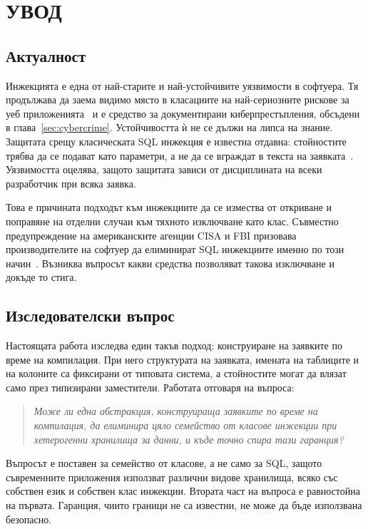 \section*{УВОД}
\label{sec:introduction}

\subsection*{Актуалност}

Инжекцията е една от най-старите и най-устойчивите уязвимости в софтуера. Тя
продължава да заема видимо място в класациите на най-сериозните рискове за
уеб приложенията~\cite{owasp_top10} и е средство за документирани
киберпрестъпления, обсъдени в глава~\ref{sec:cybercrime}. Устойчивостта ѝ не се
дължи на липса на знание. Защитата срещу класическата SQL инжекция е известна
отдавна: стойностите трябва да се подават като параметри, а не да се вграждат в
текста на заявката~\cite{owasp_sqli_prevention}. Уязвимостта оцелява, защото
защитата зависи от дисциплината на всеки разработчик при всяка заявка.

Това е причината подходът към инжекциите да се измества от откриване и поправяне
на отделни случаи към тяхното изключване като клас. Съвместно предупреждение на
американските агенции CISA и FBI призовава производителите на софтуер да
елиминират SQL инжекциите именно по този начин~\cite{cisa_sqli_alert}. Възниква
въпросът какви средства позволяват такова изключване и докъде то стига.

\subsection*{Изследователски въпрос}

Настоящата работа изследва един такъв подход: конструиране на заявките по време
на компилация. При него структурата на заявката, имената на таблиците и на
колоните са фиксирани от типовата система, а стойностите могат да влязат само
през типизирани заместители. Работата отговаря на въпроса:

\begin{quote}
\textit{Може ли една абстракция, конструираща заявките по време на компилация, да
елиминира цяло семейство от класове инжекции при хетерогенни хранилища за
данни, и къде точно спира тази гаранция?}
\end{quote}

Въпросът е поставен за семейство от класове, а не само за SQL, защото
съвременните приложения използват различни видове хранилища, всяко със собствен
език и собствен клас инжекции. Втората част на въпроса е равностойна на първата.
Гаранция, чиито граници не са известни, не може да бъде използвана безопасно.

